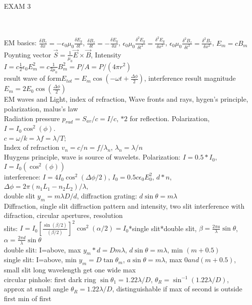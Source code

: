 \documentclass{article}
\begin{document}
\begin{Large}\\EXAM 3\end{Large} 
\\
\\\indent EM basics: $\frac{\delta B_z}{\delta x}=-\epsilon_0\mu_0\frac{\delta E_y}{\delta t}$, $\frac{\delta B_z}{\delta t}=-\frac{\delta E_y}{\delta x}$, $\epsilon_0\mu_0\frac{\delta^2E_y}{\delta t^2}=\frac{\delta^2E_y}{\delta x^2}$, $\epsilon_0\mu_0\frac{\delta^2B_z}{\delta t^2}=\frac{\delta^2B_z}{\delta x^2}$, $E_m=cB_m$
\\Poynting vector $\vec S=\frac{1}{\mu_0}\vec E\times\vec B$, Intensity $I=c\frac{1}{2}\epsilon_0E_m^2=c\frac{1}{2\mu_0}B_m^2=P/A=P/(4\pi r^2)$
\\result wave of form$E_{tot}=E_m\cos(-\omega t+\frac{\Delta\phi}{2})$, interference result magnitude $E_m=2E_0\cos(\frac{\Delta\phi}{2})$
\\\indent EM waves and Light, index of refraction, Wave fronts and rays, hygen's principle, polarization, malus's law
\\Radiation pressure $p_{rad}=S_{av}/c=I/c$, $*2$ for reflection. Polarization, $I=I_0\cos^2(\phi)$. 
\\$c=\omega/k=\lambda f=\lambda/T$;\\Index of refraction $v_n=c/n=f/\lambda_n$, $\lambda_n=\lambda/n$ 
\\Huygens principle, wave is source of wavelets. Polarization: $I=0.5*I_0$, $I=I_0(\cos^2(\phi))$
\\\indent interference: $I=4I_0\cos^2(\Delta\phi/2)$, $I_0=0.5 c \epsilon_0E_0^2$, $d*n$, $\Delta\phi=2\pi(n_1L_1-n_2L_2)/\lambda$,
\\double slit $y_m=m\lambda D/d$, diffraction grating: $d\sin\theta=m\lambda$
\\\indent Diffraction, single slit diffraction pattern and intensity, two slit interference with difraction, circular apertures, resolution
\\slits: $I=I_0[\frac{\sin(\beta/2)}{(\beta/2)}]^2\cos^2(\alpha/2)=I_0$*single slit*double slit, $\beta=\frac{2\pi a}{\lambda}\sin\theta$, $\alpha=\frac{2\pi d}{\lambda}\sin\theta$
\\double slit: I=above, max $y_m*d=Dm\lambda$, $d\sin\theta=m\lambda$, min $(m+0.5)$
\\single slit: I=above, min $y_m=D\tan\theta_m$, $a\sin\theta=m\lambda$, max $0 and (m+0.5)$, small slit long wavelength get one wide max
\\circular pinhole: first dark ring $\sin\theta_1=1.22\lambda/D$, $\theta_R=\sin^{-1}(1.22\lambda/D)$, approx at small angle $\theta_R=1.22\lambda/D$, distinguishable if max of second is outside first min of first
\end{document}
